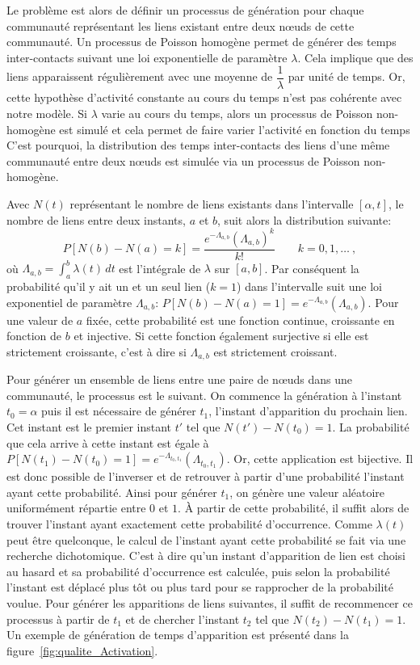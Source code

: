 Le problème est alors de définir un processus de génération pour chaque communauté représentant les liens existant entre deux n\oe uds de cette communauté.
Un processus de Poisson homogène permet de générer des temps inter-contacts suivant une loi exponentielle de paramètre $\lambda$.
Cela implique que des liens apparaissent régulièrement avec une moyenne de $\dfrac{1}{\lambda}$ par unité de temps.
Or, cette hypothèse d'activité constante au cours du temps n'est pas cohérente avec notre modèle.
Si $\lambda$ varie au cours du temps, alors un processus de Poisson non-homogène est simulé et cela permet de faire varier l'activité en fonction du temps
C'est pourquoi, la distribution des temps inter-contacts des liens d'une même communauté entre deux n\oe uds est simulée via un processus de Poisson non-homogène.


Avec $N(t)$ représentant le nombre de liens existants dans l'intervalle $[\alpha,t]$, le nombre de liens entre deux instants, $a$ et $b$, suit alors la distribution suivante:
\begin{equation}
P [N(b) - N(a) = k] = \frac{e^{-\Lambda_{a,b}} (\Lambda_{a,b})^k}{k!} \qquad k= 0,1,\ldots \ ,
\end{equation}
où $\Lambda_{a,b}=\int_a^b \lambda(t)\,dt$ est l'intégrale de $\lambda$ sur $[a,b]$.
Par conséquent la probabilité qu'il y ait un et un seul lien ($k=1$) dans l'intervalle suit une loi exponentiel de paramètre $\Lambda_{a,b}$: $P [N(b) - N(a) = 1]=e^{-\Lambda_{a,b}} (\Lambda_{a,b})$.
Pour une valeur de $a$ fixée, cette probabilité est une fonction continue, croissante en fonction de $b$ et injective.
Si cette fonction également surjective si elle est strictement croissante, c'est à dire si $\Lambda_{a,b}$ est strictement croissant.

Pour générer un ensemble de liens entre une paire de n\oe uds dans une communauté, le processus est le suivant.
On commence la génération à l'instant $t_0=\alpha$ puis il est nécessaire de générer $t_1$, l'instant d'apparition du prochain lien.
Cet instant est le premier instant $t'$ tel que $N(t')- N(t_0)=1$.
La probabilité que cela arrive à cette instant est égale à $P [N(t_1) - N(t_0) = 1]=e^{-\Lambda_{t_0,t_1}} (\Lambda_{t_0,t_1})$.
Or, cette application est bijective.
Il est donc possible de l'inverser et de retrouver à partir d'une probabilité l'instant ayant cette probabilité.
Ainsi pour générer $t_1$, on génère une valeur aléatoire uniformément répartie entre $0$ et $1$.
\`A partir de cette probabilité, il suffit alors de trouver l'instant ayant exactement cette probabilité d'occurrence.
Comme $\lambda(t)$ peut être quelconque, le calcul de l'instant ayant cette probabilité se fait via une recherche dichotomique.
C'est à dire qu'un instant d'apparition de lien est choisi au hasard et sa probabilité d'occurrence est calculée, puis selon la probabilité l'instant est déplacé plus tôt ou plus tard pour se rapprocher de la probabilité voulue.
Pour générer les apparitions de liens suivantes, il suffit de recommencer ce processus à partir de $t_1$ et de chercher l'instant $t_2$ tel que $N(t_2)- N(t_1)=1$.
Un exemple de génération de temps d'apparition est présenté dans la figure~\ref{fig:qualite_Activation}.


